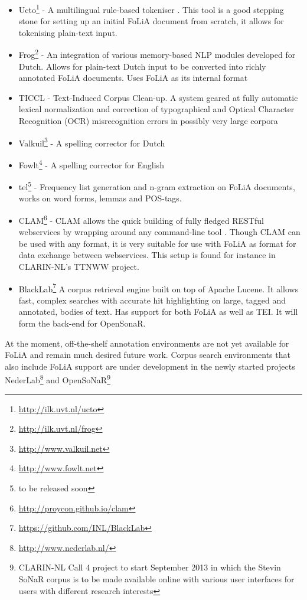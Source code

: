 \documentclass[a4paper,10pt,twoside]{article}
\begin{document}
\begin{itemize}
  \item Ucto\footnote{\url{http://ilk.uvt.nl/ucto}} - A multilingual rule-based
    tokeniser \cite{UCTO}. This tool is a good stepping stone for setting up an initial
    FoLiA document from scratch, it allows for  tokenising plain-text input.
  \item Frog\footnote{\url{http://ilk.uvt.nl/frog}} - An integration of various memory-based NLP modules developed for Dutch. Allows for plain-text Dutch input to be converted into richly
  annotated FoLiA documents. Uses FoLiA as its internal format
 \item TICCL - Text-Induced Corpus Clean-up. A system geared at fully automatic lexical normalization and correction of typographical and Optical Character Recognition (OCR) misrecognition errors in possibly very large corpora \cite{Reynaert2010}
 \item Valkuil\footnote{\url{http://www.valkuil.net}} - A spelling corrector for Dutch
 \item Fowlt\footnote{\url{http://www.fowlt.net}} - A spelling corrector for English
 \item tel\footnote{to be released soon} - Frequency list generation and n-gram
   extraction on FoLiA documents, works on word forms, lemmas and POS-tags.
 \item CLAM\footnote{\url{http://proycon.github.io/clam}} - CLAM allows the quick
   building of fully fledged RESTful webservices by wrapping around any
   command-line tool \cite{CLAM}. Though CLAM can be used with any format, it
   is very suitable for use with FoLiA as format for data exchange between
   webservices. This setup is found for instance in CLARIN-NL's TTNWW project. 
 \item BlackLab\footnote{\url{https://github.com/INL/BlackLab}} A corpus retrieval
   engine built on top of Apache Lucene. It allows fast, complex searches with
   accurate hit highlighting on large, tagged and annotated, bodies of text.
   Has support for both FoLiA as well as TEI. It will form the back-end for OpenSonaR.
\end{itemize}

At the moment, off-the-shelf annotation environments are not yet available for
FoLiA and remain much desired future work. Corpus search environments that also include
FoLiA support are under development in the newly started projects
NederLab\footnote{\url{http://www.nederlab.nl/}} and OpenSoNaR\footnote{CLARIN-NL
Call 4 project to start September 2013 in which the Stevin SoNaR corpus is to
be made available online with various user interfaces for users with different
research interests}
\end{document}
